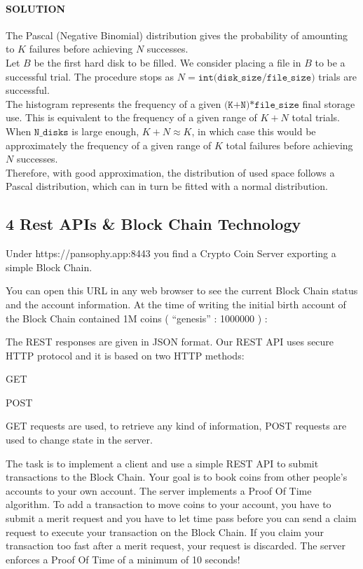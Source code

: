 \documentclass[11pt]{article}
\begin{document}
    \hypertarget{solution}{%
\paragraph{SOLUTION}\label{solution}}

The Pascal (Negative Binomial) distribution gives the probability of
amounting to \(K\) failures before achieving \(N\) successes.\\
Let \(B\) be the first hard disk to be filled. We consider placing a
file in \(B\) to be a successful trial. The procedure stops as
\(N = \texttt{int(disk}\_\texttt{size/file}\_\texttt{size)}\) trials are
successful.\\
The histogram represents the frequency of a given
\(\texttt{(K+N)*file}\_\texttt{size}\) final storage use. This is
equivalent to the frequency of a given range of \(K+N\) total trials.\\
When \(\texttt{N}\_\texttt{disks}\) is large enough, \(K+N \approx K\),
in which case this would be approximately the frequency of a given range
of \(K\) total failures before achieving \(N\) successes.\\
Therefore, with good approximation, the distribution of used space
follows a Pascal distribution, which can in turn be fitted with a normal
distribution.

    \hypertarget{rest-apis-block-chain-technology}{%
\subsection{4 Rest APIs \& Block Chain
Technology}\label{rest-apis-block-chain-technology}}

    Under https://pansophy.app:8443 you find a Crypto Coin Server exporting
a simple Block Chain.

You can open this URL in any web browser to see the current Block Chain
status and the account information. At the time of writing the initial
birth account of the Block Chain contained 1M coins ( ``genesis'' :
1000000 ) :

The REST responses are given in JSON format. Our REST API uses secure
HTTP protocol and it is based on two HTTP methods:

GET

POST

GET requests are used, to retrieve any kind of information, POST
requests are used to change state in the server.

The task is to implement a client and use a simple REST API to submit
transactions to the Block Chain. Your goal is to book coins from other
people's accounts to your own account. The server implements a Proof Of
Time algorithm. To add a transaction to move coins to your account, you
have to submit a merit request and you have to let time pass before you
can send a claim request to execute your transaction on the Block Chain.
If you claim your transaction too fast after a merit request, your
request is discarded. The server enforces a Proof Of Time of a minimum
of 10 seconds!
\end{document}
